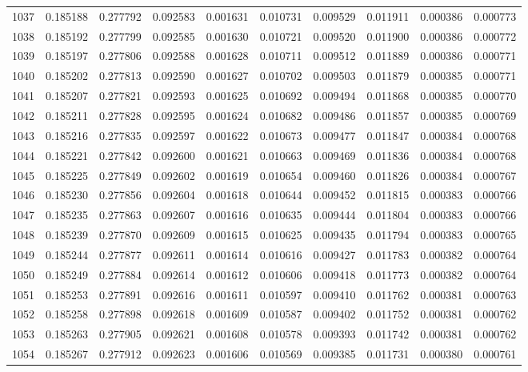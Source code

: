 \begin{tabular}{lrrrrrrrrr}
1037 & 0.185188 & 0.277792 & 0.092583 & 0.001631 & 0.010731 & 0.009529 & 0.011911 & 0.000386 & 0.000773 \\
1038 & 0.185192 & 0.277799 & 0.092585 & 0.001630 & 0.010721 & 0.009520 & 0.011900 & 0.000386 & 0.000772 \\
1039 & 0.185197 & 0.277806 & 0.092588 & 0.001628 & 0.010711 & 0.009512 & 0.011889 & 0.000386 & 0.000771 \\
1040 & 0.185202 & 0.277813 & 0.092590 & 0.001627 & 0.010702 & 0.009503 & 0.011879 & 0.000385 & 0.000771 \\
1041 & 0.185207 & 0.277821 & 0.092593 & 0.001625 & 0.010692 & 0.009494 & 0.011868 & 0.000385 & 0.000770 \\
1042 & 0.185211 & 0.277828 & 0.092595 & 0.001624 & 0.010682 & 0.009486 & 0.011857 & 0.000385 & 0.000769 \\
1043 & 0.185216 & 0.277835 & 0.092597 & 0.001622 & 0.010673 & 0.009477 & 0.011847 & 0.000384 & 0.000768 \\
1044 & 0.185221 & 0.277842 & 0.092600 & 0.001621 & 0.010663 & 0.009469 & 0.011836 & 0.000384 & 0.000768 \\
1045 & 0.185225 & 0.277849 & 0.092602 & 0.001619 & 0.010654 & 0.009460 & 0.011826 & 0.000384 & 0.000767 \\
1046 & 0.185230 & 0.277856 & 0.092604 & 0.001618 & 0.010644 & 0.009452 & 0.011815 & 0.000383 & 0.000766 \\
1047 & 0.185235 & 0.277863 & 0.092607 & 0.001616 & 0.010635 & 0.009444 & 0.011804 & 0.000383 & 0.000766 \\
1048 & 0.185239 & 0.277870 & 0.092609 & 0.001615 & 0.010625 & 0.009435 & 0.011794 & 0.000383 & 0.000765 \\
1049 & 0.185244 & 0.277877 & 0.092611 & 0.001614 & 0.010616 & 0.009427 & 0.011783 & 0.000382 & 0.000764 \\
1050 & 0.185249 & 0.277884 & 0.092614 & 0.001612 & 0.010606 & 0.009418 & 0.011773 & 0.000382 & 0.000764 \\
1051 & 0.185253 & 0.277891 & 0.092616 & 0.001611 & 0.010597 & 0.009410 & 0.011762 & 0.000381 & 0.000763 \\
1052 & 0.185258 & 0.277898 & 0.092618 & 0.001609 & 0.010587 & 0.009402 & 0.011752 & 0.000381 & 0.000762 \\
1053 & 0.185263 & 0.277905 & 0.092621 & 0.001608 & 0.010578 & 0.009393 & 0.011742 & 0.000381 & 0.000762 \\
1054 & 0.185267 & 0.277912 & 0.092623 & 0.001606 & 0.010569 & 0.009385 & 0.011731 & 0.000380 & 0.000761 \\

\end{tabular}
